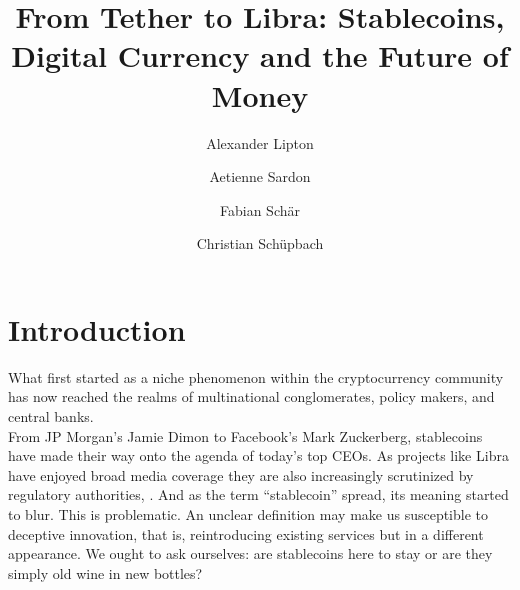 \documentclass[conference]{IEEEtran}
\begin{document}
\title{From Tether to Libra: Stablecoins, \\ Digital Currency and the Future of Money}

\author[1]{Alexander Lipton}
\author[2]{Aetienne Sardon}
\author[3]{Fabian Sch\"{a}r}
\author[2]{Christian Sch\"{u}pbach}
\maketitle

\begin{acronym}[aligator]
\end{acronym}

\section{Introduction}
What first started as a niche phenomenon within the cryptocurrency community has now reached the realms of multinational conglomerates, policy makers, and central banks.\\

From JP Morgan's Jamie Dimon to Facebook's Mark Zuckerberg, stablecoins have made their way onto the agenda of today's top CEOs. As projects like Libra have enjoyed broad media coverage they are also increasingly scrutinized by regulatory authorities, \cite{EU}\cite{Congress}\cite{FINMA}. And as the term ``stablecoin'' spread, its meaning started to blur. This is problematic. An unclear definition may make us susceptible to deceptive innovation, that is, reintroducing existing services but in a different appearance. We ought to ask ourselves: are stablecoins here to stay or are they simply old wine in new bottles?\\
\end{document}

